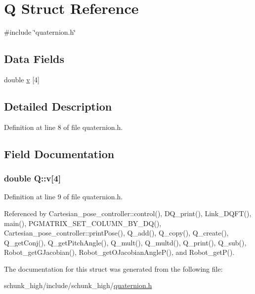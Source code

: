 \hypertarget{structQ}{\section{Q Struct Reference}
\label{structQ}
}


{\ttfamily \#include \char`\"{}quaternion.\-h\char`\"{}}

\subsection*{Data Fields}
\begin{DoxyCompactItemize}
\item 
double \hyperlink{structQ_a2a0074b583999340d42804e4c1141ac4}{v} \mbox{[}4\mbox{]}
\end{DoxyCompactItemize}


\subsection{Detailed Description}


Definition at line 8 of file quaternion.\-h.



\subsection{Field Documentation}
\hypertarget{structQ_a2a0074b583999340d42804e4c1141ac4}{
\subsubsection[{v}]{\setlength{\rightskip}{0pt plus 5cm}double Q\-::v\mbox{[}4\mbox{]}}}\label{structQ_a2a0074b583999340d42804e4c1141ac4}


Definition at line 9 of file quaternion.\-h.



Referenced by Cartesian\-\_\-pose\-\_\-controller\-::control(), D\-Q\-\_\-print(), Link\-\_\-\-D\-Q\-F\-T(), main(), P\-G\-M\-A\-T\-R\-I\-X\-\_\-\-S\-E\-T\-\_\-\-C\-O\-L\-U\-M\-N\-\_\-\-B\-Y\-\_\-\-D\-Q(), Cartesian\-\_\-pose\-\_\-controller\-::print\-Pose(), Q\-\_\-add(), Q\-\_\-copy(), Q\-\_\-create(), Q\-\_\-get\-Conj(), Q\-\_\-get\-Pitch\-Angle(), Q\-\_\-mult(), Q\-\_\-multd(), Q\-\_\-print(), Q\-\_\-sub(), Robot\-\_\-get\-G\-Jacobian(), Robot\-\_\-get\-O\-Jacobian\-Angle\-P(), and Robot\-\_\-get\-P().



The documentation for this struct was generated from the following file\-:\begin{DoxyCompactItemize}
\item 
schunk\-\_\-high/include/schunk\-\_\-high/\hyperlink{quaternion_8h}{quaternion.\-h}\end{DoxyCompactItemize}
